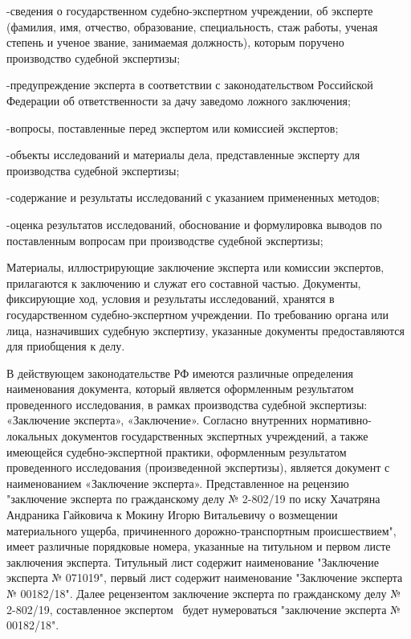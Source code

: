 \noindent -сведения о государственном судебно-экспертном учреждении, об эксперте (фамилия, имя, отчество, образование, специальность, стаж работы, ученая степень и ученое звание, занимаемая должность), которым поручено производство судебной экспертизы;

\noindent -предупреждение эксперта в соответствии с законодательством Российской Федерации об ответственности за дачу заведомо ложного заключения;

\noindent -вопросы, поставленные перед экспертом или комиссией экспертов;

\noindent -объекты исследований и материалы дела, представленные эксперту для производства судебной экспертизы;

\noindent -содержание и результаты исследований с указанием примененных методов;

\noindent -оценка результатов исследований, обоснование и формулировка выводов по поставленным вопросам  при производстве судебной экспертизы;

	\vspace{2mm}
	
Материалы, иллюстрирующие заключение эксперта или комиссии экспертов, прилагаются к заключению и служат его составной частью. Документы, фиксирующие ход, условия и результаты исследований, хранятся в государственном судебно-экспертном учреждении. По требованию органа или лица, назначивших судебную экспертизу, указанные документы предоставляются для приобщения к делу.

В действующем законодательстве РФ имеются различные определения наименования документа, который является оформленным результатом проведенного исследования, в рамках производства судебной экспертизы: «Заключение эксперта», «Заключение». Согласно внутренних нормативно-локальных документов государственных экспертных учреждений, а также имеющейся судебно-экспертной практики, оформленным результатом проведенного исследования (произведенной экспертизы), является документ с наименованием «Заключение эксперта». Представленное на рецензию "заключение эксперта  по гражданскому делу № 2-802/19 по иску Хачатряна Андраника Гайковича к Мокину Игорю Витальевичу о возмещении материального ущерба, причиненного дорожно-транспортным происшествием", имеет различные  порядковые номера, указанные на титульном и первом листе заключения эксперта. Титульный лист   содержит наименование "Заключение эксперта № 071019", первый лист содержит наименование "Заключение эксперта № 00182/18". Далее рецензентом заключение эксперта по гражданскому делу № 2-802/19, составленное экспертом  \, будет  нумероваться "заключение эксперта № 00182/18". 


